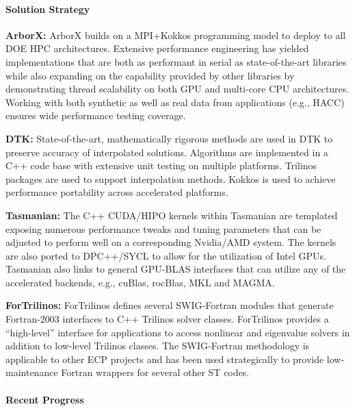 \paragraph{Solution Strategy}

\nobreak


\indent

{\bf ArborX:} ArborX builds on a MPI+Kokkos programming model to deploy to all
DOE HPC architectures. Extensive performance engineering has yielded
implementations that are both as performant in serial as state-of-the-art
libraries while also expanding on the capability provided by other libraries by
demonstrating thread scalability on both GPU and multi-core CPU architectures.
Working with both synthetic as well as real data from applications (e.g., HACC)
ensures wide performance testing coverage.

{\bf DTK:} State-of-the-art, mathematically rigorous methods are used in DTK
to preserve accuracy of interpolated solutions.  Algorithms are implemented in
a C++ code base with extensive unit testing on multiple platforms.  Trilinos
packages are used to support interpolation methods.  Kokkos is used to achieve
performance portability across accelerated platforms.

{\bf Tasmanian:} The C++ CUDA/HIPO kernels within Tasmanian are templated exposing
numerous performance tweaks and tuning parameters that can be adjusted to
perform well on a corresponding Nvidia/AMD system.
The kernels are also ported to DPC++/SYCL to allow for the utilization
of Intel GPUs. Tasmanian also links to general GPU-BLAS interfaces that can
utilize any of the accelerated backends, e.g., cuBlas, rocBlas, MKL and MAGMA.

{\bf ForTrilinos:}
ForTrilinos defines several SWIG-Fortran modules that generate Fortran-2003
interfaces to C++ Trilinos solver classes. ForTrilinos provides a
``high-level'' interface for applications to access nonlinear and eigenvalue
solvers in addition to low-level Trilinos classes. The SWIG-Fortran methodology
is applicable to other ECP projects and has been used strategically to provide
low-maintenance Fortran wrappers for several other ST codes.


\paragraph{Recent Progress}

\indent

